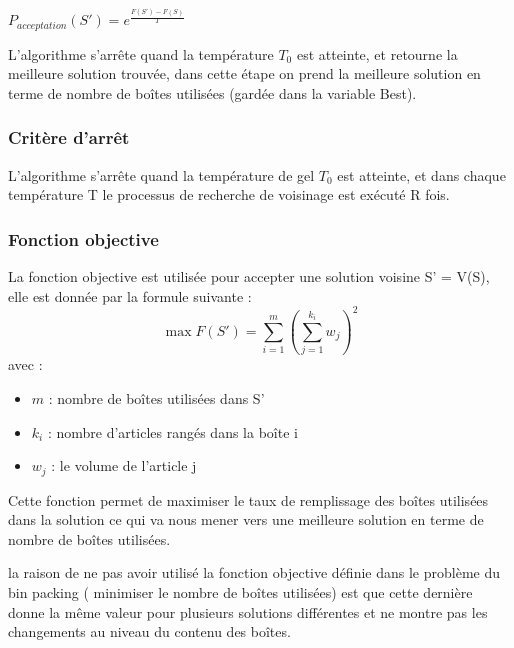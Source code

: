 \documentclass[12pt]{article}
\begin{document}
$ P_{acceptation}(S') = e^{\frac{F(S')-F(S)}{T}}$ \newline



L’algorithme s'arrête quand la température \emph{$T_{0}$} est atteinte, et retourne la meilleure solution trouvée,
 dans cette étape on prend la meilleure solution en terme de nombre de boîtes utilisées (gardée dans la variable Best). 

\subsubsection{Critère d'arrêt}
L’algorithme s’arrête quand la température de gel \emph{$T_{0}$} est atteinte, et dans chaque température T le processus de recherche de voisinage est exécuté R fois.

\subsubsection{Fonction objective}
La fonction objective est utilisée pour accepter une solution voisine S’ = V(S), elle est donnée par la formule suivante \cite{sonuc2017solving} : 
\begin{equation}
    \max{F(S')} = \sum_{i=1}^m (\sum_{j=1}^{k_{i}} w_{j})^{2}
\end{equation}
avec : 
\begin{itemize}
\item \(m\) : nombre de boîtes utilisées dans S’ 
\item \(k_i\) : nombre d’articles rangés dans la boîte i 
\item \(w_j\) : le volume de l’article j 
\end{itemize}
Cette fonction permet de maximiser le taux de remplissage des boîtes utilisées dans la solution ce qui va nous mener vers une meilleure solution en terme de nombre de boîtes utilisées. 

la raison de ne pas avoir utilisé la fonction objective définie dans le problème du bin packing ( minimiser le nombre de boîtes utilisées) est que cette dernière donne la même valeur pour plusieurs solutions différentes et ne montre pas les changements au niveau du contenu des boîtes. 
\end{document}
